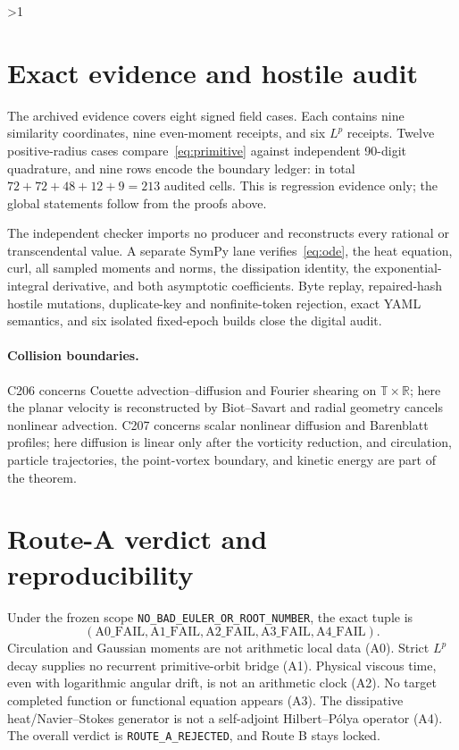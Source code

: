 \documentclass[10pt]{article}
\providecommand{\CRevisionRound}{2}
\newcommand{\R}{\mathbb R}
\begin{document}
\ifnum\CRevisionRound>1
\section{Exact evidence and hostile audit}
The archived evidence covers eight signed field cases.  Each contains nine
similarity coordinates, nine even-moment receipts, and six $L^p$ receipts.
Twelve positive-radius cases compare~\eqref{eq:primitive} against independent
90-digit quadrature, and nine rows encode the boundary ledger: in total
$72+72+48+12+9=213$ audited cells.  This is regression evidence only; the
global statements follow from the proofs above.

The independent checker imports no producer and reconstructs every rational
or transcendental value.  A separate SymPy lane verifies~\eqref{eq:ode},
the heat equation, curl, all sampled moments and norms, the dissipation
identity, the exponential-integral derivative, and both asymptotic
coefficients.  Byte replay, repaired-hash hostile mutations, duplicate-key
and nonfinite-token rejection, exact YAML semantics, and six isolated
fixed-epoch builds close the digital audit.

\paragraph{Collision boundaries.}
C206 concerns Couette advection--diffusion and Fourier shearing on
$\mathbb T\times\R$; here the planar velocity is reconstructed by
Biot--Savart and radial geometry cancels nonlinear advection.  C207 concerns
scalar nonlinear diffusion and Barenblatt profiles; here diffusion is linear
only after the vorticity reduction, and circulation, particle trajectories,
the point-vortex boundary, and kinetic energy are part of the theorem.

\section{Route-A verdict and reproducibility}
Under the frozen scope \texttt{NO\_BAD\_EULER\_OR\_ROOT\_NUMBER}, the exact
tuple is
\[
 (\mathrm{A0\_FAIL},\mathrm{A1\_FAIL},\mathrm{A2\_FAIL},
   \mathrm{A3\_FAIL},\mathrm{A4\_FAIL}).
\]
Circulation and Gaussian moments are not arithmetic local data (A0).  Strict
$L^p$ decay supplies no recurrent primitive-orbit bridge (A1).  Physical
viscous time, even with logarithmic angular drift, is not an arithmetic clock
(A2).  No target completed function or functional equation appears (A3).
The dissipative heat/Navier--Stokes generator is not a self-adjoint
Hilbert--P\'olya operator (A4).  The overall verdict is
\texttt{ROUTE\_A\_REJECTED}, and Route B stays locked.
\end{document}
